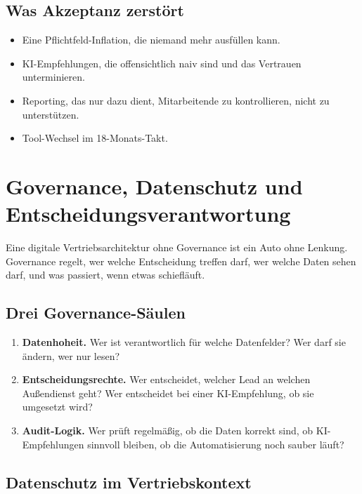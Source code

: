 \documentclass[11pt,a4paper,oneside]{article}
\newcommand{\fachbegriff}[1]{\textbf{#1}}
\begin{document}
\subsection{Was Akzeptanz zerstört}

\begin{itemize}
  \item Eine Pflichtfeld-Inflation, die niemand mehr ausfüllen kann.
  \item KI-Empfehlungen, die offensichtlich naiv sind und das Vertrauen unterminieren.
  \item Reporting, das nur dazu dient, Mitarbeitende zu kontrollieren, nicht zu unterstützen.
  \item Tool-Wechsel im 18-Monats-Takt.
\end{itemize}

\section{Governance, Datenschutz und Entscheidungsverantwortung}

Eine digitale Vertriebsarchitektur ohne Governance ist ein Auto ohne Lenkung. Governance regelt, wer welche Entscheidung treffen darf, wer welche Daten sehen darf, und was passiert, wenn etwas schiefläuft.

\subsection{Drei Governance-Säulen}

\begin{enumerate}
  \item \fachbegriff{Datenhoheit.} Wer ist verantwortlich für welche Datenfelder? Wer darf sie ändern, wer nur lesen?
  \item \fachbegriff{Entscheidungsrechte.} Wer entscheidet, welcher Lead an welchen Außendienst geht? Wer entscheidet bei einer KI-Empfehlung, ob sie umgesetzt wird?
  \item \fachbegriff{Audit-Logik.} Wer prüft regelmäßig, ob die Daten korrekt sind, ob KI-Empfehlungen sinnvoll bleiben, ob die Automatisierung noch sauber läuft?
\end{enumerate}

\subsection{Datenschutz im Vertriebskontext}
\end{document}
